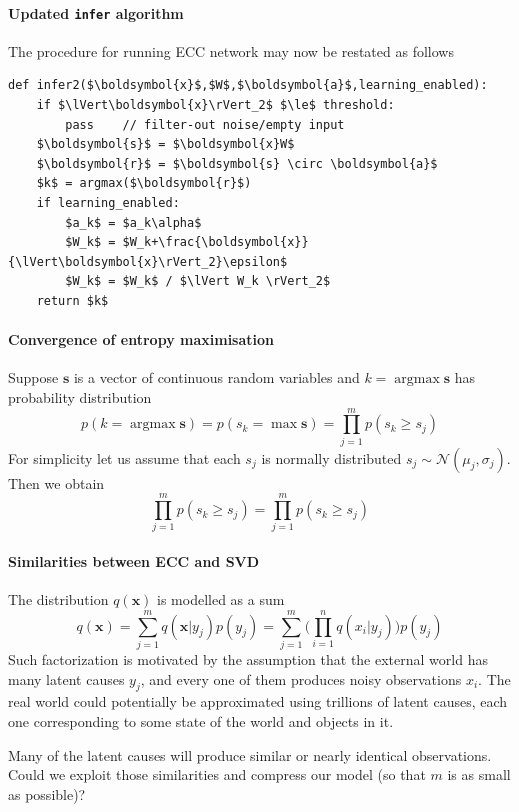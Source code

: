 \documentclass[12pt]{article}
\DeclareMathOperator*{\argmax}{argmax}
\begin{document}
\paragraph{Updated \texttt{infer} algorithm} The procedure for running ECC network may now be restated as follows

\begin{lstlisting}
def infer2($\boldsymbol{x}$,$W$,$\boldsymbol{a}$,learning_enabled):
    if $\lVert\boldsymbol{x}\rVert_2$ $\le$ threshold:
        pass    // filter-out noise/empty input
    $\boldsymbol{s}$ = $\boldsymbol{x}W$
    $\boldsymbol{r}$ = $\boldsymbol{s} \circ \boldsymbol{a}$
    $k$ = argmax($\boldsymbol{r}$)
    if learning_enabled:
        $a_k$ = $a_k\alpha$
        $W_k$ = $W_k+\frac{\boldsymbol{x}}{\lVert\boldsymbol{x}\rVert_2}\epsilon$
        $W_k$ = $W_k$ / $\lVert W_k \rVert_2$
    return $k$
\end{lstlisting}

\paragraph{Convergence of entropy maximisation}

Suppose $\boldsymbol{s}$ is a vector of continuous random variables and $k=\argmax \boldsymbol{s}$ has  probability distribution
\[
p(k=\argmax \boldsymbol{s}) = p(s_k = \max \boldsymbol{s}) = \prod_{j=1}^{m}p(s_k \ge  s_j)
\]
For simplicity let us assume that each $s_j$ is normally distributed $s_j\sim \mathcal{N}(\mu_j,\sigma_j)$. Then we obtain
\[
\prod_{j=1}^{m}p(s_k \ge  s_j) = \prod_{j=1}^{m}p(s_k \ge  s_j)
\]
\paragraph{Similarities between ECC and SVD}

The distribution $q(\boldsymbol{x})$ is modelled as a sum
\[
q(\boldsymbol{x}) = \sum_{j=1}^{m}q(\boldsymbol{x}|y_j)p(y_j)  = \sum_{j=1}^{m}\big(\prod_{i=1}^n q(x_i|y_j)\big)p(y_j) 
\]
Such factorization is motivated by the assumption that the external world has many latent causes $y_j$, and every one of them produces noisy observations $x_i$. The real world could potentially be approximated using trillions of latent causes, each one corresponding to some state of the world and objects in it. 

Many of the latent causes will produce similar or nearly identical observations. Could we exploit those similarities and compress our model (so that $m$ is as small as possible)? 
\end{document}
